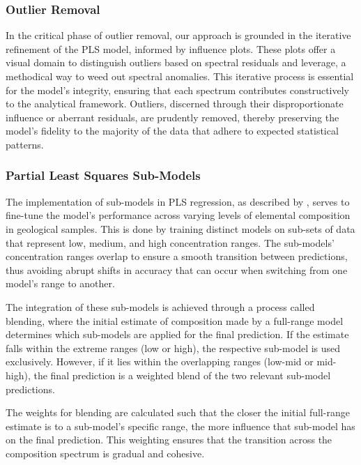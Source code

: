 \subsubsection{Outlier Removal}\label{sec:outlier_removal}

In the critical phase of outlier removal, our approach is grounded in the iterative refinement of the PLS model, informed by influence plots.
These plots offer a visual domain to distinguish outliers based on spectral residuals and leverage, a methodical way to weed out spectral anomalies.
This iterative process is essential for the model's integrity, ensuring that each spectrum contributes constructively to the analytical framework.
Outliers, discerned through their disproportionate influence or aberrant residuals, are prudently removed, thereby preserving the model's fidelity to the majority of the data that adhere to expected statistical patterns.


\subsubsection{Partial Least Squares Sub-Models}\label{sec:pls_submodels}

The implementation of sub-models in PLS regression, as described by \citet{andersonImprovedAccuracyQuantitative2017}, serves to fine-tune the model's performance across varying levels of elemental composition in geological samples. This is done by training distinct models on sub-sets of data that represent low, medium, and high concentration ranges. The sub-models' concentration ranges overlap to ensure a smooth transition between predictions, thus avoiding abrupt shifts in accuracy that can occur when switching from one model's range to another.

The integration of these sub-models is achieved through a process called blending, where the initial estimate of composition made by a full-range model determines which sub-models are applied for the final prediction. If the estimate falls within the extreme ranges (low or high), the respective sub-model is used exclusively. However, if it lies within the overlapping ranges (low-mid or mid-high), the final prediction is a weighted blend of the two relevant sub-model predictions.

The weights for blending are calculated such that the closer the initial full-range estimate is to a sub-model's specific range, the more influence that sub-model has on the final prediction. This weighting ensures that the transition across the composition spectrum is gradual and cohesive.

